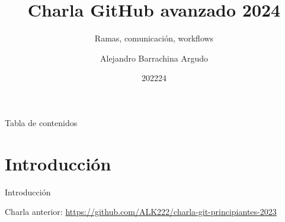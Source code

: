 \documentclass{beamer}
\title{Charla GitHub avanzado 2024}
\subtitle{Ramas, comunicación, workflows}
\date{202224}
\author{Alejandro Barrachina Argudo}
\institute{Universidad Complutense de Madrid}
\begin{document}
\maketitle

\begin{frame}{Tabla de contenidos}
    \tableofcontents
\end{frame}

\section{Introducción}
\begin{frame}{Introducción}

    Charla anterior: \url{https://github.com/ALK222/charla-git-principiantes-2023}

\end{frame}
\end{document}
